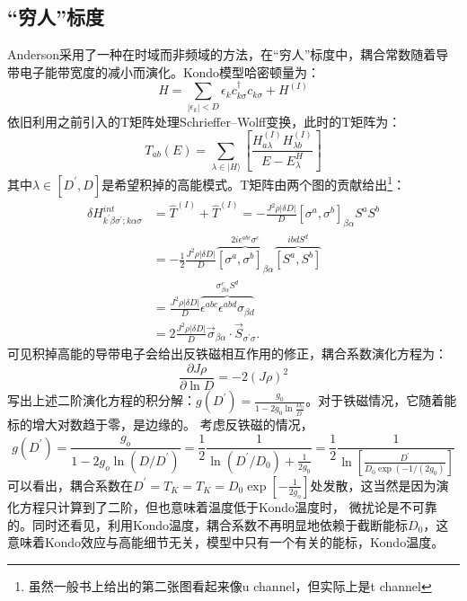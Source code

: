 \documentclass[10pt,openany]{book}
\theoremstyle{thmstyle} %
\theoremstyle{defstyle} %
\theoremstyle{prostyle} %
\begin{document}
\subsection*{“穷人”标度}
Anderson采用了一种在时域而非频域的方法，在“穷人”标度中，耦合常数随着导带电子能带宽度的减小而演化。Kondo模型哈密顿量为：
\begin{equation}
  H=\sum_{\left|\epsilon_k\right|<D} \epsilon_k c_{k \sigma}^{\dagger} c_{k \sigma}+H^{(I)}
\end{equation}
依旧利用之前引入的T矩阵处理Schrieffer–Wolff变换，此时的T矩阵为：
\begin{equation}
  T_{a b}(E)=\sum_{\lambda \in|H\rangle}\left[\frac{H_{a \lambda}^{(I)} H_{\lambda b}^{(I)}}{E-E_\lambda^H}\right]
\end{equation}
其中$ \lambda\in \left[D^{\prime}, D\right] $是希望积掉的高能模式。T矩阵由两个图的贡献给出\footnote{虽然一般书上给出的第二张图看起来像u channel，但实际上是t channel}：
\begin{equation}
  \begin{aligned}
    \delta H_{k^{\prime} \beta \sigma^{\prime} ; k \alpha \sigma}^{i n t} & =\hat{T}^{(I)}+\hat{T}^{(I)}=-\frac{J^2 \rho|\delta D|}{D}\left[\sigma^a, \sigma^b\right]_{\beta \alpha} S^a S^b \\
    & =-\frac{1}{2} \frac{J^2 \rho|\delta D|}{D} \overbrace{\left[\sigma^a, \sigma^b\right]_{\beta \alpha}}^{2 i \epsilon^{a b c} \sigma^c} \overbrace{\left[S^a, S^b\right]}^{i b d S^d} \\
    & =\frac{J^2 \rho|\delta D|}{D} \overbrace{\epsilon^{a b c} \epsilon^{a b d} \sigma_{\beta d}}^{\sigma_{\beta \alpha}^c S^d} \\
    & =2 \frac{J^2 \rho|\delta D|}{D} \vec{\sigma}_{\beta \alpha} \cdot \vec{S}_{\sigma^{\prime} \sigma} .
    \end{aligned}
\end{equation}
可见积掉高能的导带电子会给出反铁磁相互作用的修正，耦合系数演化方程为：
\begin{equation}
  \frac{\partial J \rho}{\partial \ln D}=-2(J \rho)^2
\end{equation}
写出上述二阶演化方程的积分解：$ g\left(D^{\prime}\right)=\frac{g_0}{1-2 g_0 \ln \frac{D_0}{D^{\prime}}} $。对于铁磁情况，它随着能标的增大对数趋于零，是边缘的。 考虑反铁磁的情况，
\begin{equation}
  g\left(D^{\prime}\right)=\frac{g_o}{1-2 g_o \ln \left(D / D^{\prime}\right)}=\frac{1}{2} \frac{1}{\ln \left(D^{\prime} / D_0\right)+\frac{1}{2 g_0}}=\frac{1}{2} \frac{1}{\ln \left[\frac{D^{\prime}}{D_0 \exp \left(-1 /\left(2 g_0\right)\right.}\right]}
\end{equation}
可以看出，耦合系数在$ D^{\prime}=T_K=T_K=D_0 \exp \left[-\frac{1}{2 g_o}\right] $处发散，这当然是因为演化方程只计算到了二阶，但也意味着温度低于Kondo温度时，
微扰论是不可靠的。同时还看见，利用Kondo温度，耦合系数不再明显地依赖于截断能标$ D_0 $，这意味着Kondo效应与高能细节无关，模型中只有一个有关的能标，Kondo温度。\\
\end{document}

